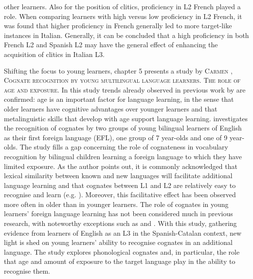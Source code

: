 \documentclass[output=paper,colorlinks,citecolor=brown,nonflat]{langsci/langscibook}
\begin{document}
other learners. Also for the position of clitics, proficiency in L2 French played a role. When comparing learners with high versus low proficiency in L2 French, it was found that higher proficiency in French generally led to more target-like instances in Italian. Generally, it can be concluded that a high proficiency in both French L2 and Spanish L2 may have the general effect of enhancing the acquisition of clitics in Italian L3.

Shifting the focus to young learners, chapter 5 presents a study by \textsc{Carmen \citeauthor{chapters/munoz}, Cognate recognition by young multilingual language learners. The role of age and exposure}. In this study trends already observed in previous work by \citet{Muñoz2006Book, Muñoz2014Complexities} are confirmed: age is an important factor for language learning, in the sense that older learners have cognitive advantages over younger learners and that metalinguistic skills that develop with age support language learning. \citeauthor{chapters/munoz} investigates the recognition of cognates by two groups of young bilingual learners of English as their first foreign language (EFL), one group of 7 year-olds and one of 9 year-olds. The study fills a gap concerning the role of cognateness in vocabulary recognition by bilingual children learning a foreign language to which they have limited exposure. As the author points out, it is commonly acknowledged that lexical similarity between known and new languages will facilitate additional language learning \citep{Ringbom2007} and that cognates between L1 and L2 are relatively easy to recognise and learn (e.g. \citealt{EllisNBeaton1993, DeGrootvanHell2005}). Moreover, this facilitative effect has been observed more often in older than in younger learners. The role of cognates in young learners’ foreign language learning has not been considered much in previous research, with noteworthy exceptions such as \citet{Otwinowska2016} and \citet{GoriotEtAl2018}. With this study, gathering evidence from learners of English as an L3 in the Spanish-Catalan context, new light is shed on young learners’ ability to recognise cognates in an additional language. The study explores phonological cognates and, in particular, the role that age and amount of exposure to the target language play in the ability to recognise them.
\end{document}

